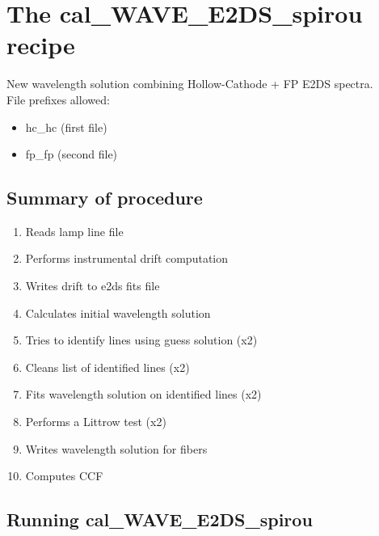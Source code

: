 

\clearpage
\newpage
\section{The cal\_WAVE\_E2DS\_spirou recipe}
\label{section:cal_WAVE_E2DS_spirou}

New wavelength solution combining Hollow-Cathode + FP E2DS spectra. \\


\noindent File prefixes allowed:
\begin{itemize}
	\item hc\_hc (first file)
	\item fp\_fp (second file)
\end{itemize}

\subsection{Summary of procedure}
\begin{enumerate}
	\item Reads lamp line file
	\item Performs instrumental drift computation
	\item Writes drift to e2ds fits file
	\item Calculates initial wavelength solution
	\item Tries to identify lines using guess solution (x2) 
	\item Cleans list of identified lines (x2)
	\item Fits wavelength solution on identified lines (x2)
	\item Performs a Littrow test (x2)
	\item Writes wavelength solution for fibers
	\item Computes CCF
\end{enumerate}

\subsection{Running cal\_WAVE\_E2DS\_spirou}

